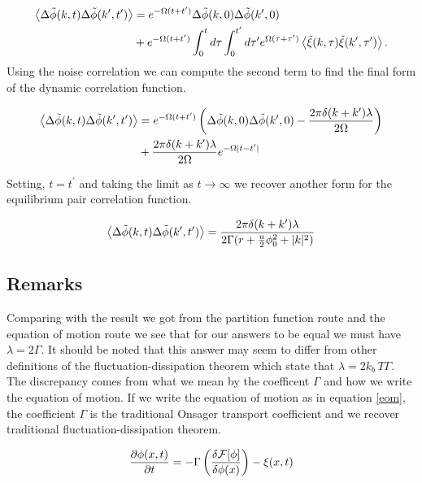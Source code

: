 \begin{align}
\left\langle \Delta\tilde{\phi}(k, t) \Delta\tilde{\phi}(k^\prime, t^\prime)\right\rangle &=  e^{-\Omega(t+t^\prime)}\Delta\tilde{\phi}(k, 0)\Delta\tilde{\phi}(k^\prime, 0) \nonumber \\
 &+ e^{-\Omega (t+t^\prime)} \int_0^t d\tau \int_0^{t^\prime} d\tau^\prime e^{\Omega(\tau+\tau^\prime)}\left\langle \tilde{\xi}(k, \tau) \tilde{\xi}(k^\prime, \tau^\prime) \right\rangle.
\end{align}
Using the noise correlation we can compute the second term to find the final form of the dynamic correlation function. 

\begin{align}
	\left\langle \Delta\tilde{\phi}(k, t) \Delta\tilde{\phi}(k^\prime, t^\prime)\right\rangle &=  e^{-\Omega(t+t^\prime)}\left(\Delta\tilde{\phi}(k, 0)\Delta\tilde{\phi}(k^\prime, 0) - \frac{2\pi\delta(k+k^\prime)\lambda}{2\Omega}\right) \nonumber \\
	&+ \frac{2\pi\delta(k+k^\prime)\lambda}{2\Omega}e^{-\Omega \vert t-t^\prime \vert}
\end{align}

Setting, $t = t^\prime$ and taking the limit as $t\rightarrow\infty$ we recover another form for the equilibrium pair correlation function. 

\begin{equation}
	\left\langle \Delta\tilde{\phi}(k, t) \Delta\tilde{\phi}(k^\prime, t^\prime)\right\rangle = \frac{2\pi\delta(k+k^\prime)\lambda}{2\Gamma(r + \frac{u}{2}\phi_0^2 + \vert k\vert^2)}
\end{equation}

\subsection{Remarks}

Comparing with the result we got from the partition function route and the equation of motion route we see that for our answers to be equal we must have $\lambda = 2\Gamma$. It should be noted that this answer may seem to differ from other definitions of the fluctuation-dissipation theorem which state that $\lambda = 2k_b\,T\Gamma$. The discrepancy comes from what we mean by the coefficent $\Gamma$ and how we write the equation of motion. If we write the equation of motion as in equation \ref{eom}, the coefficient $\Gamma$ is the traditional Onsager transport coefficient and we recover traditional fluctuation-dissipation theorem. 

\begin{equation}\label{eom}
	\frac{\partial \phi(x,t)}{\partial t} = -\Gamma \left(\frac{\delta \mathcal{F}[\phi]}{\delta \phi(x)}\right) - \xi(x,t)
\end{equation}   

